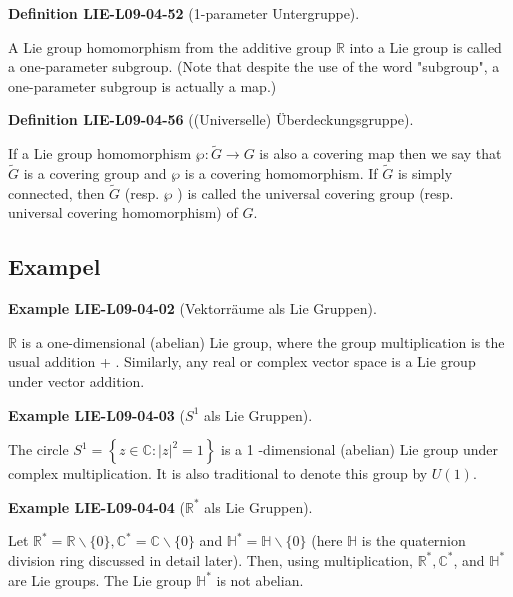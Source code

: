 \documentclass[10pt, letterpaper]{article}
\newcommand{\R}{\mathbb{R}}
\newcommand{\CustomHeading}[3]{%
  \par\medskip\noindent%
  \textbf{#1 #2} \textnormal{(#3)}.\enskip%
}
\newenvironment{DEF}[2]{\CustomHeading{Definition}{#1}{#2}}{}
\newenvironment{EXA}[2]{\CustomHeading{Example}{#1}{#2}}{}
\begin{document}
\begin{DEF}{LIE-L09-04-52}{1-parameter Untergruppe}
A Lie group homomorphism from the additive group $\mathbb{R}$ into a Lie group is called a one-parameter subgroup. (Note that despite the use of the word "subgroup", a one-parameter subgroup is actually a map.)
\end{DEF}

\begin{DEF}{LIE-L09-04-56}{(Universelle) Überdeckungsgruppe}
If a Lie group homomorphism $\wp: \widetilde{G} \rightarrow G$ is also a covering map then we say that $\widetilde{G}$ is a covering group and $\wp$ is a covering homomorphism. If $\widetilde{G}$ is simply connected, then $\widetilde{G}$ (resp. $\wp$ ) is called the universal covering group (resp. universal covering homomorphism) of $G$.
\end{DEF}

\subsection{Exampel}

\begin{EXA}{LIE-L09-04-02}{Vektorräume als Lie Gruppen}
$\mathbb{R}$ is a one-dimensional (abelian) Lie group, where the group multiplication is the usual addition + . Similarly, any real or complex vector space is a Lie group under vector addition.
\end{EXA}

\begin{EXA}{LIE-L09-04-03}{$S^1$ als Lie Gruppen}
The circle $S^{1}=\left\{z \in \mathbb{C}:|z|^{2}=1\right\}$ is a 1 -dimensional (abelian) Lie group under complex multiplication. It is also traditional to denote this group by $U(1)$.
\end{EXA}

\begin{EXA}{LIE-L09-04-04}{$\R^*$ als Lie Gruppen}
Let $\mathbb{R}^{*}=\mathbb{R} \backslash\{0\}, \mathbb{C}^{*}=\mathbb{C} \backslash\{0\}$ and $\mathbb{H}^{*}=\mathbb{H} \backslash\{0\}$ (here $\mathbb{H}$ is the quaternion division ring discussed in detail later). Then, using multiplication, $\mathbb{R}^{*}, \mathbb{C}^{*}$, and $\mathbb{H}^{*}$ are Lie groups. The Lie group $\mathbb{H}^{*}$ is not abelian.
\end{EXA}
\end{document}
